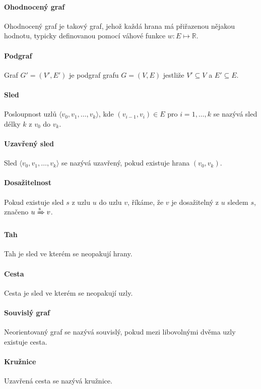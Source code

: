 \paragraph*{Ohodnocený graf} Ohodnocený graf je takový graf, jehož každá hrana má přiřazenou nějakou hodnotu, typicky definovanou pomocí váhové funkce $w : E \mapsto \mathbb{R}$.

\paragraph*{Podgraf} Graf $G' = (V', E')$ je podgraf grafu $G = (V, E)$ jestliže $V' \subseteq V$ a $E' \subseteq E$.

\paragraph*{Sled} Posloupnost uzlů $\langle v_0, v_1, \dots, v_k \rangle$, kde $(v_{i-1}, v_i) \in E$ pro $i = 1, \dots, k$ se nazývá sled délky $k$ z $v_0$ do $v_k$.

\paragraph*{Uzavřený sled} Sled $\langle v_0, v_1, \dots, v_k \rangle$ se nazývá uzavřený, pokud existuje hrana $(v_0, v_k)$.

\paragraph*{Dosažitelnost} Pokud existuje sled $s$ z uzlu $u$ do uzlu $v$, říkáme, že $v$ je dosažitelný z $u$ sledem $s$, značeno $u \xRightarrow{\text{s}} v$.

\paragraph*{Tah} Tah je sled ve kterém se neopakují hrany.

\paragraph*{Cesta} Cesta je sled ve kterém se neopakují uzly.

\paragraph*{Souvislý graf} Neorientovaný graf se nazývá souvislý, pokud mezi libovolnými dvěma uzly existuje cesta.

\paragraph*{Kružnice} Uzavřená cesta se nazývá kružnice.

